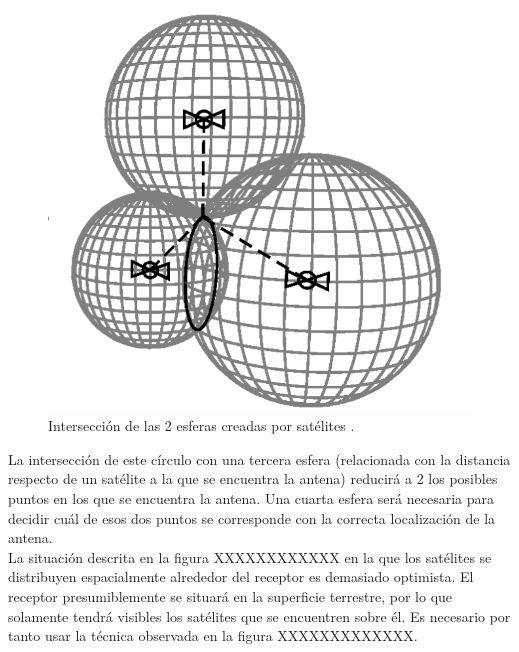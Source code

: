 \begin{figure}
	\centering
	\includegraphics[width=1\textwidth]{imagenes/interseccion2esferas.PNG}
	\caption{\label{fig1}Intersección de las 2 esferas creadas por satélites \cite{gnss}.}
\end{figure}

La intersección de este círculo con una tercera esfera (relacionada con la distancia respecto de un satélite a la que se encuentra la antena) reducirá a 2 los posibles puntos en los que se encuentra la antena. Una cuarta esfera será necesaria para decidir cuál de esos dos puntos se corresponde con la correcta localización de la antena. \\
La situación descrita en la figura XXXXXXXXXXXX en la que los satélites se distribuyen espacialmente alrededor del receptor es demasiado optimista. El receptor presumiblemente se situará en la superficie terrestre, por lo que solamente tendrá visibles los satélites que se encuentren sobre él. Es necesario por tanto usar la técnica observada en la figura XXXXXXXXXXXXX.

